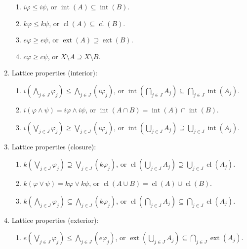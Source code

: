 \documentclass{treatise}
\begin{document}
\begin{proposition}
\begin{enumerate}
    \begin{enumerate}
        \item $i\varphi \leq i\psi$, or $\operatorname{int}(A) \subseteq \operatorname{int}(B)$.
        \item $k\varphi \leq k\psi$, or $\operatorname{cl}(A) \subseteq \operatorname{cl}(B)$.
        \item $e\varphi \geq e\psi$, or $\operatorname{ext}(A) \supseteq \operatorname{ext}(B)$.
        \item $c\varphi \geq c\psi$, or $X \setminus A \supseteq X \setminus B$.
    \end{enumerate}
    \item Lattice properties (interior):
    \begin{enumerate}
        \item $i \left( \bigwedge_{j \in J} \varphi_j \right) \leq \bigwedge_{j \in J} (i\varphi_j)$, or $\operatorname{int} \left( \bigcap_{j \in J} A_j \right) \subseteq \bigcap_{j \in J} \operatorname{int}(A_j)$.
        \item $i(\varphi \wedge \psi) = i\varphi \wedge i \psi$, or $\operatorname{int}(A \cap B) = \operatorname{int}(A) \cap \operatorname{int}(B)$.
        \item $i \left( \bigvee_{j \in J} \varphi_j \right) \geq \bigvee_{j \in J} (i\varphi_j)$, or $\operatorname{int} \left( \bigcup_{j \in J} A_j \right) \supseteq \bigcup_{j \in J} \operatorname{int}(A_j)$.
    \end{enumerate}
    \item Lattice properties (closure):
    \begin{enumerate}
        \item $k \left( \bigvee_{j \in J} \varphi_j \right) \supseteq \bigvee_{j \in J} (k \varphi_j)$, or $\operatorname{cl} \left( \bigcup_{j \in J} A_j \right) \supseteq \bigcup_{j \in J} \operatorname{cl}(A_j)$.
        \item $k(\varphi \vee \psi) = k\varphi \vee k\psi$, or $\operatorname{cl}(A \cup B) = \operatorname{cl}(A) \cup \operatorname{cl}(B)$.
        \item $k \left( \bigwedge_{j \in J} \varphi_j \right) \subseteq \bigwedge_{j \in J} (k \varphi_j)$, or $\operatorname{cl} \left( \bigcap_{j \in J} A_j \right) \subseteq \bigcap_{j \in J} \operatorname{cl}(A_j)$.
    \end{enumerate}
    \item Lattice properties (exterior):
    \begin{enumerate}
        \item $e \left( \bigvee_{j \in J} \varphi_j  \right) \leq \bigwedge_{j \in J} (e\varphi_j)$, or $\operatorname{ext} \left( \bigcup_{j \in J} A_j \right) \subseteq \bigcap_{j \in J} \operatorname{ext}(A_j)$.

\end{enumerate}
\end{enumerate}
\end{proposition}
\end{document}
